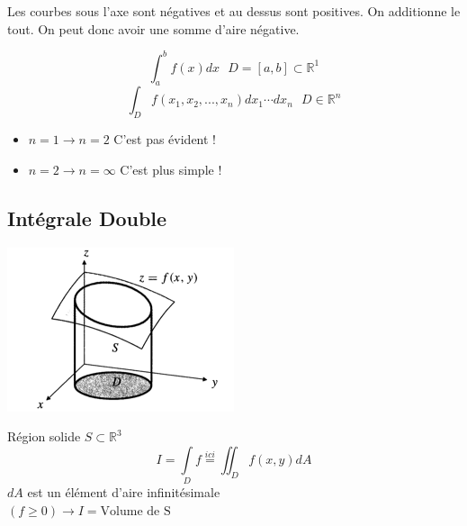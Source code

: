 \begin{myrem}

Les courbes sous l'axe sont négatives et au dessus sont positives. On additionne le tout. On peut donc avoir une somme d'aire négative.

$$\int_{a}^{b} {f(x) dx} \textbf{        } D=[a,b] \subset \mathbb{R}^1$$
$$\int_D f(x_1,x_2,...,x_n)dx_1 \cdots dx_n \textbf{      } D \in \mathbb{R}^n$$
\begin{itemize}


\item $n=1 \to n=2$ C'est pas évident !
\item $n=2 \to n= \infty $ C'est plus simple !

\end{itemize}
\end{myrem}





\subsection{Intégrale Double}
\includegraphics[scale=1]{image3.png}






Région solide $ S \subset \mathbb{R}^3$
\[I=\int \limits_{D}f\overset{ici}{=}\iint_D f (x,y) dA\]
$dA$ est un élément d'aire infinitésimale
\\
$(f \ge 0) \to I = \text{Volume de S}$


